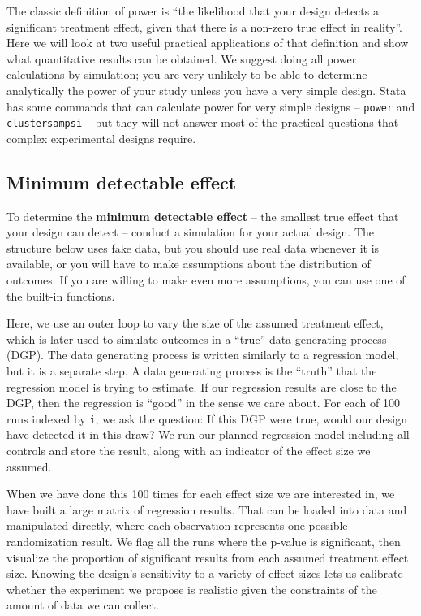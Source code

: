 The classic definition of power is
``the likelihood that your design detects a significant treatment effect,
given that there is a non-zero true effect in reality''.
Here we will look at two useful practical applications
of that definition and show what quantitative results can be obtained.
We suggest doing all power calculations by simulation;
you are very unlikely to be able to determine analytically
the power of your study unless you have a very simple design.
Stata has some commands that can calculate power for
very simple designs -- \texttt{power} and \texttt{clustersampsi} --
but they will not answer most of the practical questions
that complex experimental designs require.

\subsection{Minimum detectable effect}

To determine the \textbf{minimum detectable effect}
-- the smallest true effect that your design can detect --
conduct a simulation for your actual design.
The structure below uses fake data,
but you should use real data whenever it is available,
or you will have to make assumptions about the distribution of outcomes.
If you are willing to make even more assumptions,
you can use one of the built-in functions.

Here, we use an outer loop to vary the size of the assumed treatment effect,
which is later used to simulate outcomes in a ``true''
data-generating process (DGP).
The data generating process is written similarly to a
regression model, but it is a separate step.
A data generating process is the ``truth''
that the regression model is trying to estimate.
If our regression results are close to the DGP,
then the regression is ``good'' in the sense we care about.
For each of 100 runs indexed by \texttt{i},
we ask the question: If this DGP were true,
would our design have detected it in this draw?
We run our planned regression model including all controls and store the result,
along with an indicator of the effect size we assumed.

When we have done this 100 times for each effect size we are interested in,
we have built a large matrix of regression results.
That can be loaded into data and manipulated directly,
where each observation represents one possible randomization result.
We flag all the runs where the p-value is significant,
then visualize the proportion of significant results
from each assumed treatment effect size.
Knowing the design's sensitivity to a variety of effect sizes
lets us calibrate whether the experiment we propose
is realistic given the constraints of the amount of data we can collect.

